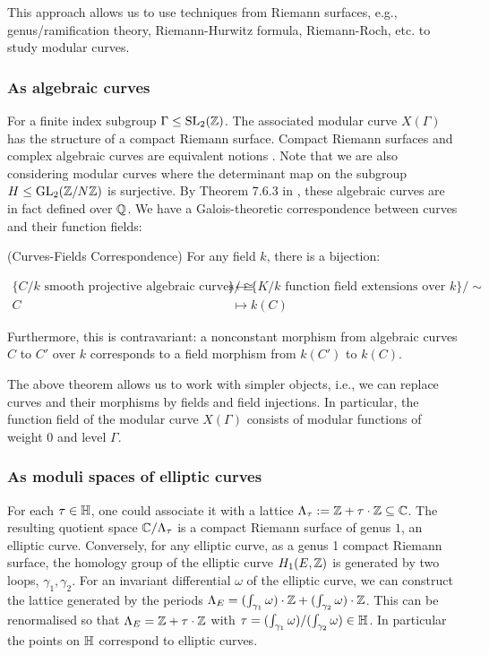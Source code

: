 This approach allows us to use techniques from Riemann surfaces, e.g., genus/ramification theory, Riemann-Hurwitz formula, Riemann-Roch, etc. to study modular curves.

\subsubsection{As algebraic curves}

For a finite index subgroup $\Gamma \leq \operatorname{SL}_2(\mathbb{Z})$. The associated modular curve $X(\Gamma)$ has the structure of a compact Riemann surface. Compact Riemann surfaces and complex algebraic curves are equivalent notions \cite{forster}. Note that we are also considering modular curves where the determinant map on the subgroup $H \leq \operatorname{GL}_2(\mathbb{Z}/N\mathbb{Z})$ is surjective. By Theorem 7.6.3 in \cite{Shurman}, these algebraic curves are in fact defined over $\mathbb{Q}$. We have a Galois-theoretic correspondence between curves and their function fields:

\begin{theorem}{(Curves-Fields Correspondence)} For any field $k$, there is a bijection:

\begin{align*}
\{\text{$C/k$ smooth projective algebraic curves}\}/\cong &\leftrightarrow \{\text{$K/k$ function field extensions over $k$}\}/\sim \\
C &\mapsto k(C)
\end{align*}

Furthermore, this is contravariant: a nonconstant morphism from  algebraic curves $C$ to $C'$ over $k$ corresponds to a field morphism from $k(C')$ to $k(C)$.

\end{theorem}

The above theorem allows us to work with simpler objects, i.e., we can replace curves and their morphisms by fields and field injections. In particular, the function field of the modular curve $X(\Gamma)$ consists of modular functions of weight $0$ and level $\Gamma$. 

\subsubsection{As moduli spaces of elliptic curves}

For each $\tau \in \mathbb{H}$, one could associate it with a lattice $\Lambda_\tau := \mathbb{Z} + \tau \cdot \mathbb{Z} \subseteq \mathbb{C}$. The resulting quotient space $\mathbb{C}/\Lambda_\tau$ is a compact Riemann surface of genus $1$, an elliptic curve. Conversely, for any elliptic curve, as a genus 1 compact Riemann surface, the homology group of the elliptic curve $H_1(E,\mathbb{Z})$ is generated by two loops, $\gamma_1, \gamma_2$. For an invariant differential $\omega$ of the elliptic curve, we can construct the lattice generated by the periods $\Lambda_E = (\int_{\gamma_1} \omega) \cdot \mathbb{Z} + (\int_{\gamma_2} \omega) \cdot \mathbb{Z}$. This can be renormalised so that $\Lambda_E = \mathbb{Z} + \tau \cdot \mathbb{Z}$ with $\tau = (\int_{\gamma_1} \omega) /(\int_{\gamma_2} \omega) \in \mathbb{H}$. In particular the points on $\mathbb{H}$ correspond to elliptic curves.

